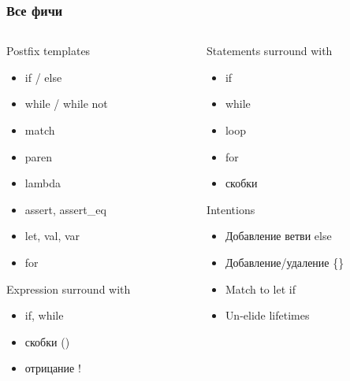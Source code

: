 \documentclass[10pt,pdf,hyperref={unicode}]{beamer}
\begin{document}
\begin{frame}
	\frametitle{Все фичи} 
	\begin{columns}
		\begin{column}{0.4\textwidth}
			\begin{block}{Postfix templates}
				\begin{itemize}
					\item if / else
					\item while / while not
					\item match
					\item paren 
					\item lambda
					\item assert, assert\_eq
					\item let, val, var
					\item for
				\end{itemize}
			\end{block}
			
			\begin{block}{Expression surround with}
				\begin{itemize}
					\item if, while
					\item скобки ()
					\item отрицание !
				\end{itemize}
			\end{block}
		\end{column}
		
		\begin{column}{0.4\textwidth}			
			\begin{block}{Statements surround with}
				\begin{itemize}
					\item if
					\item while
					\item loop
					\item for
					\item скобки {}
				\end{itemize}
			\end{block}
			
			\begin{block}{Intentions}			
				\begin{itemize}
					\item Добавление ветви else
					\item Добавление/удаление \{\}
					\item Match to let if
					\item Un-elide lifetimes
				\end{itemize}
			\end{block}	
		\end{column}
\end{columns}
\end{frame}
\end{document}
